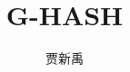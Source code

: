 \documentclass{article}
\title{G-HASH\cite{G-HASH}}
\author{贾新禹}
\begin{document}
\maketitle
\tableofcontents
\clearpage

\clearpage







\clearpage
\renewcommand\refname{参考文献}


\end{document}
